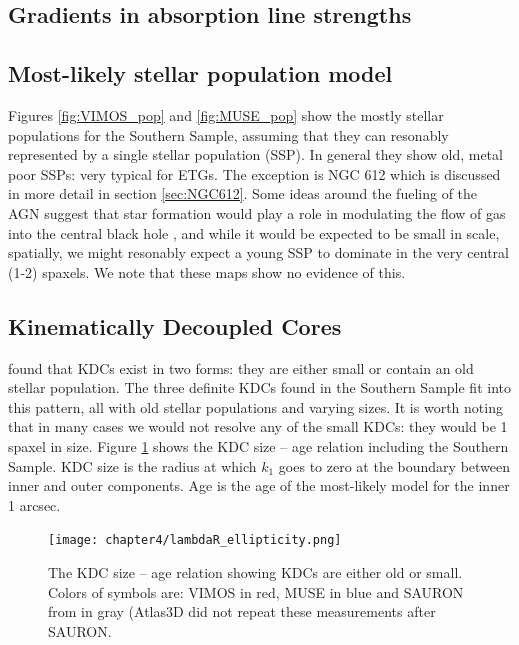 	\subsection{Gradients in absorption line strengths}
		\label{subsec:absorptionGrad}


	\subsection{Most-likely stellar population model}
		Figures \ref{fig:VIMOS_pop} and \ref{fig:MUSE_pop} show the mostly stellar populations for the Southern Sample, assuming that they can resonably represented by a single stellar population (SSP). In general they show old, metal poor SSPs: very typical for ETGs. The exception is NGC 612 which is discussed in more detail in section \ref{sec:NGC612}. Some ideas around the fueling of the AGN suggest that star formation would play a role in modulating the flow of gas into the central black hole \citep{}, and while it would be expected to be small in scale, spatially, we might resonably expect a young SSP to dominate in the very central (1-2) spaxels. We note that these maps show no evidence of this. 


	\subsection{Kinematically Decoupled Cores}
		\label{sec:popKDC}

		\citet{Kuntschner2010} found that KDCs exist in two forms: they are either small or contain an old stellar population. The three definite KDCs found in the Southern Sample fit into this pattern, all with old stellar populations and varying sizes. It is worth noting that in many cases we would not resolve any of the small KDCs: they would be 1 spaxel in size. Figure \ref{fig:KDC} shows the KDC size -- age relation including the Southern Sample. KDC size is the radius at which $k_1$ goes to zero at the boundary between inner and outer components. Age is the age of the most-likely model for the inner 1 arcsec. 

		\begin{figure}
			\centering
			\texttt{[image: chapter4/lambdaR\_ellipticity.png]}
			\caption[KDC dichotomy]{The KDC size -- age relation showing KDCs are either old or small. Colors of symbols are: VIMOS in red, MUSE in blue and SAURON from \citet{Kuntschner2010} in gray (Atlas3D did not repeat these measurements after SAURON.}
			\label{fig:KDC}
		\end{figure}


